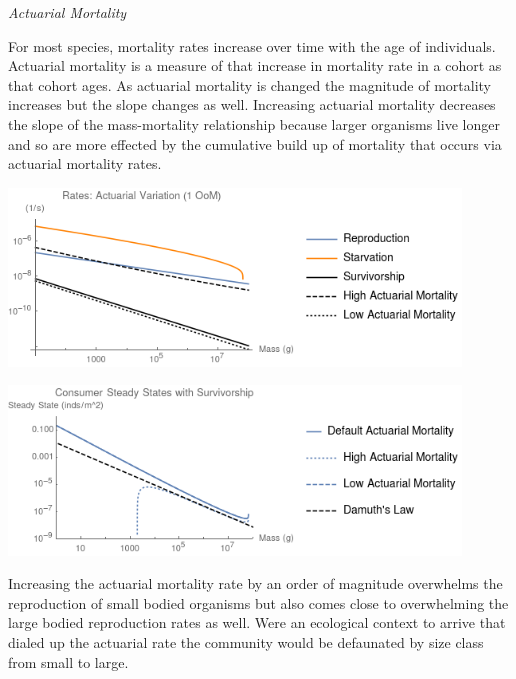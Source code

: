 \documentclass[]{rsos}%
\begin{document}
\emph{Actuarial Mortality}

For most species, mortality rates increase over time with the age of individuals. Actuarial mortality is a measure of that increase in mortality rate in a cohort as that cohort ages. As actuarial mortality is changed the magnitude of mortality increases but the slope changes as well. Increasing actuarial mortality decreases the slope of the mass-mortality relationship because larger organisms live longer and so are more effected by the cumulative build up of mortality that occurs via actuarial mortality rates.\\

\vspace{0.5cm}

\includegraphics[width=0.9\textwidth]{actuarial_plot.png}\\ 

\vspace{0.5cm}


\includegraphics[width=0.9\textwidth]{actuarial_damuth_plot.png}\\ 

\vspace{0.5cm}

Increasing the actuarial mortality rate by an order of magnitude overwhelms the reproduction of small bodied organisms but also comes close to overwhelming the large bodied reproduction rates as well. Were an ecological context to arrive that dialed up the actuarial rate the community would be defaunated by size class from small to large. \\
\end{document}
